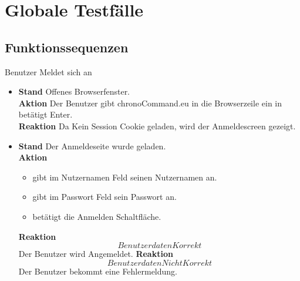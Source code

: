 \section{Globale Testfälle}

\subsection{Funktionssequenzen}
\begin{requirements}
	 Benutzer Meldet sich an
	\begin{itemize}
  			\item
  			    \textbf{Stand} Offenes Browserfenster. \\
  			    \textbf{Aktion} Der Benutzer gibt chronoCommand.eu in die Browserzeile ein in betätigt Enter. \\
  			    \textbf{Reaktion} Da Kein Session Cookie geladen, wird der Anmeldescreen gezeigt.
  			\item
  			    \textbf{Stand} Der Anmeldeseite wurde geladen.\\
                \textbf{Aktion}
                    \begin{itemize} Der Benutzer
                        \item gibt im Nutzernamen Feld seinen Nutzernamen an.
                        \item gibt im Passwort Feld sein Passwort an.
                        \item betätigt die Anmelden Schaltfläche.
                    \end{itemize}
                \begin{itemize}
                    \textbf{Reaktion\[Benutzerdaten Korrekt\]} Der Benutzer wird Angemeldet.
                    \textbf{Reaktion\[Benutzerdaten Nicht Korrekt\]} Der Benutzer bekommt eine Fehlermeldung.
                \end{itemize}


\end{itemize}
\end{requirements}
